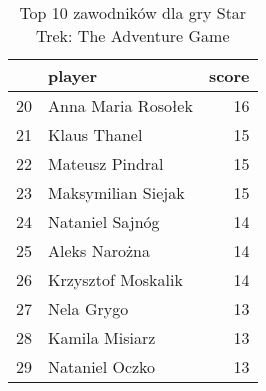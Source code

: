 
\begin{table}[h]
\caption{Top 10 zawodników dla gry Star Trek: The Adventure Game}\label{tab:top10_3}
\centering
\begin{tabular}{rlr}
\hline
    & player             &   score \\
\hline
 20 & Anna Maria Rosołek &      16 \\
 21 & Klaus Thanel       &      15 \\
 22 & Mateusz Pindral    &      15 \\
 23 & Maksymilian Siejak &      15 \\
 24 & Nataniel Sajnóg    &      14 \\
 25 & Aleks Narożna      &      14 \\
 26 & Krzysztof Moskalik &      14 \\
 27 & Nela Grygo         &      13 \\
 28 & Kamila Misiarz     &      13 \\
 29 & Nataniel Oczko     &      13 \\
\hline
\end{tabular}
\end{table}

